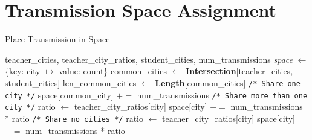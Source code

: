 \documentclass[12pt,english]{article}
\newcommand{\pluseq}{\mathrel{{+}{=}}}
\newcommand{\myindent}[1]{
\newline\makebox[#1cm]{}
}
\begin{document}
\newpage
\section{Transmission Space Assignment}
\begin{center}
\begin{minipage}{.8\linewidth}
\begin{algorithm}[H]
\caption{Place Transmission in Space}\label{euclid}
\begin{algorithmic}[1]
\Require teacher\_cities, teacher\_city\_ratios, student\_cities, \myindent{1} num\_transmissions
\State \textit{space} $\gets$ \{key: city $\mapsto$	
 value: count\}
\State common\_cities $\gets$ \textbf{Intersection}[teacher\_cities, student\_cities]
\State len\_common\_cities $\gets$ \textbf{Length}[common\_cities]
     \hfill \texttt{\small{/* Share one city */}}
      \State space[common\_city] $\pluseq$ num\_transmissions
    \EndCase
     \hfill \texttt{\small{/* Share more than one city */}}
        \State ratio $\gets$ teacher\_city\_ratios[city]
        \State space[city] $\pluseq$ num\_transmissions * ratio
      \EndForeach
    \EndCase
     \hfill \texttt{\small{/* Share no cities */}}
            \State ratio $\gets$ teacher\_city\_ratios[city]
            \State space[city] $\pluseq$ num\_transmissions * ratio
        \EndForeach
    \EndCase
\EndSwitch
\end{algorithmic}
\end{algorithm}
\end{minipage}
\end{center}
\end{document}
